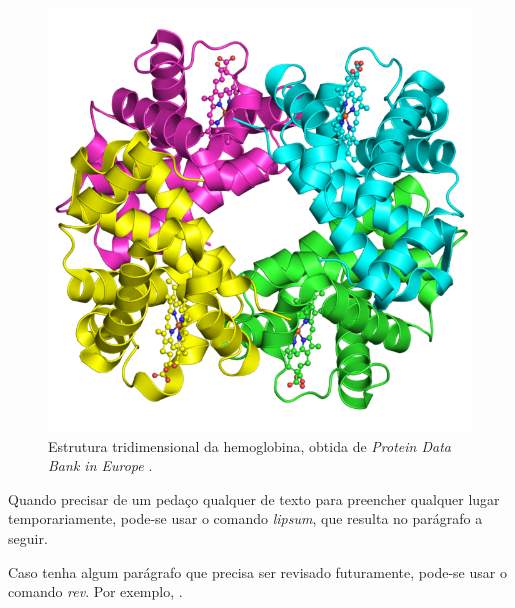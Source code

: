 \begin{figure}[htb]
    \centering
    \includegraphics[width=0.35\linewidth]{imagens/3d_hemoglobin.png}
    \caption{Estrutura tridimensional da hemoglobina, obtida de \textit{Protein Data Bank in Europe} \protect\footnotemark{}.}
    \label{fig:hemoglobin3d}
\end{figure}


Quando precisar de um pedaço qualquer de texto para preencher qualquer lugar temporariamente, pode-se usar o comando \textit{lipsum}, que resulta no parágrafo a seguir.

\lipsum[1]

Caso tenha algum parágrafo que precisa ser revisado futuramente, pode-se usar o comando \textit{rev}. Por exemplo, .